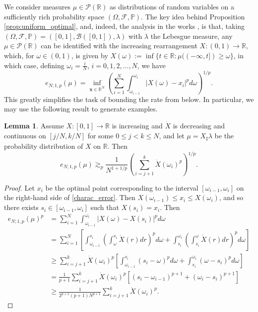 \documentclass[11pt,reqno]{amsart}
\newcommand{\bx}{{\bm{x}}}
\theoremstyle{definition}
\def\bx{{\boldsymbol x}}
\newcommand{\bm}[1]{\boldsymbol #1}
\newcommand{\RR}{{\mathbb R}}
\newcommand{\mcl}{\mathcal}
\newcommand{\mbb}{\mathbb}
\newtheorem{lemma}{Lemma}
\theoremstyle{definition}
\numberwithin{equation}{section}
\numberwithin{lemma}{section}
\numberwithin{proposition}{section}
\numberwithin{theorem}{section}
\numberwithin{corollary}{section}
\numberwithin{definition}{section}
\numberwithin{remark}{section}
\begin{document}
We consider measures $\mu \in \mcl P(\RR)$ as distributions of random variables on a sufficiently rich probability space $(\Omega, \mcl F, \mbb P)$. The key idea behind Proposition \ref{prop:uniform_optimal}, and, indeed, the analysis in the works \cite{BJ,BX}, is that, taking $(\Omega, \mcl F, \mbb P) = ([0,1], \mcl B([0,1]), \lambda)$ with $\lambda$ the Lebesgue measure, any $\mu \in \mcl P(\RR)$ can be identified with the increasing rearrangement $X: (0,1) \to \RR$, which, for $\omega \in (0,1)$, is given by $X(\omega) := \inf\{ t \in \RR : \mu( (-\infty, t]) \ge \omega \}$,
in which case, defining $\omega_i = \frac{i}{N}$, $i = 0,1,2,\ldots, N$, we have
\begin{equation}\label{charac_error}
	e_{N;1,p}(\mu) = \inf_{\bx \in \RR^N}\left( \sum_{i=1}^N \int_{\omega_{i-1}}^{\omega_i} |X(\omega) - x_i|^p d\omega \right)^{1/p}.
\end{equation}
This greatly simplifies the task of bounding the rate from below. In particular, we may use the following result to generate examples.

\begin{lemma}\label{lem:increasing:estimate}
	Assume $X: [0,1] \to \RR$ is increasing and $\dot X$ is decreasing and continuous on $[j/N,k/N]$ for some $0 \le j < k \le N$, and let $\mu = X_\sharp \lambda$ be the probability distribution of $X$ on $\RR$. Then
	\[
		e_{N;1,p}(\mu) \gtrsim_p \frac{1}{N^{1+1/p}} \left( \sum_{i=j+1}^k \dot X(\omega_i)^p \right)^{1/p}.
	\]
\end{lemma}
	
	\begin{proof}
	Let $x_i$ be the optimal point corresponding to the interval $[\omega_{i-1}, \omega_i]$ on the right-hand side of \eqref{charac_error}. Then $X(\omega_{i-1}) \le x_i \le X(\omega_i)$, and so there exists $s_i \in [\omega_{i-1}, \omega_i]$ such that $X(s_i) = x_i$. Then
	\begin{align*}
		e_{N;1,p}(\mu)^p
		&= \sum_{i=1}^N \int_{\omega_{i-1}}^{\omega_i} |X(\omega) - X(s_i)|^p d\omega\\
		&= \sum_{i=1}^N \left[  \int_{\omega_{i-1}}^{s_i} \left( \int_\omega^{s_i} \dot X(r)dr \right)^p d\omega + \int_{s_i}^{\omega_i} \left( \int_{s_i}^\omega \dot X(r)dr \right)^p d\omega \right] \\
		&\ge \sum_{i=j+1}^k \dot X(\omega_i)^p \left[  \int_{\omega_{i-1}}^{s_i} \left( s_i - \omega \right)^p d\omega + \int_{s_i}^{\omega_i} \left( \omega - s_i \right)^p d\omega \right] \\
		&= \frac{1}{p+1} \sum_{i=j+1}^k \dot X(\omega_i)^{p} \left[ (s_i - \omega_{i-1})^{p+1} + (\omega_i - s_i)^{p+1} \right] \\
		&\ge \frac{1}{2^{p+1}(p+1) N^{p+1}}\sum_{i=j+1}^k \dot X(\omega_i)^p.
	\end{align*}
\end{proof}
\end{document}
